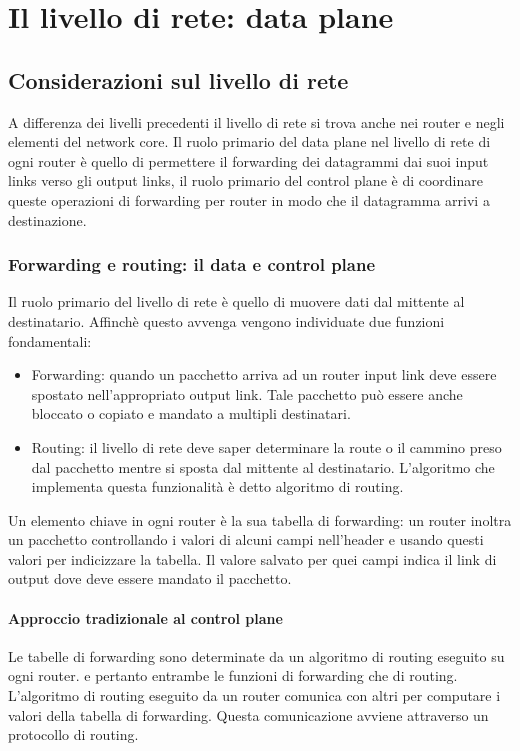 \chapter{Il livello di rete: data plane}
\section{Considerazioni sul livello di rete}
A differenza dei livelli precedenti il livello di rete si trova anche nei router e negli elementi del network core. Il ruolo primario del data plane nel 
livello di rete di ogni router \`e quello di permettere il forwarding dei datagrammi dai suoi input links verso gli output links, il ruolo primario del 
control plane \`e di coordinare queste operazioni di forwarding per router in modo che il datagramma arrivi a destinazione. 
\subsection{Forwarding e routing: il data e control plane}
Il ruolo primario del livello di rete \`e quello di muovere dati dal mittente al destinatario. Affinch\`e questo avvenga vengono individuate due funzioni
fondamentali: 
\begin{itemize}
\item Forwarding: quando un pacchetto arriva ad un router input link deve essere spostato nell'appropriato output link. Tale pacchetto pu\`o essere anche 
bloccato o copiato e mandato a multipli destinatari.
\item Routing: il livello di rete deve saper determinare la route o il cammino preso dal pacchetto mentre si sposta dal mittente al destinatario. 
L'algoritmo che implementa questa funzionalit\`a \`e detto algoritmo di routing.
\end{itemize}
Un elemento chiave in ogni router \`e la sua tabella di forwarding: un router inoltra un pacchetto controllando i valori di alcuni campi nell'header e 
usando questi valori per indicizzare la tabella. Il valore salvato per quei campi indica il link di output dove deve essere mandato il pacchetto. 
\subsubsection{Approccio tradizionale al control plane}
Le tabelle di forwarding sono determinate da un algoritmo di routing eseguito su ogni router. e pertanto entrambe le funzioni di forwarding che di
routing. L'algoritmo di routing eseguito da un router comunica con altri per computare i valori della tabella di 
forwarding. Questa comunicazione avviene attraverso un protocollo di routing. 
